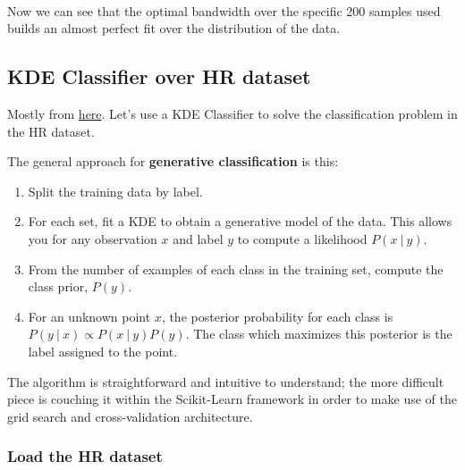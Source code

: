 \documentclass[11pt]{article}
\providecommand{\tightlist}{%
      \setlength{\itemsep}{0pt}\setlength{\parskip}{0pt}}
\begin{document}
    \begin{center}
    \end{center}
    { \hspace*{\fill} \\}
    
    Now we can see that the optimal bandwidth over the specific 200 samples
used builds an almost perfect fit over the distribution of the data.

    \hypertarget{kde-classifier-over-hr-dataset}{%
\subsection{KDE Classifier over HR
dataset}\label{kde-classifier-over-hr-dataset}}

Mostly from
\href{https://github.com/jakevdp/PythonDataScienceHandbook/blob/master/notebooks/05.13-Kernel-Density-Estimation.ipynb}{here}.
Let's use a KDE Classifier to solve the classification problem in the HR
dataset.

The general approach for \textbf{generative classification} is this:

\begin{enumerate}
\def\labelenumi{\arabic{enumi}.}
\tightlist
\item
  Split the training data by label.
\item
  For each set, fit a KDE to obtain a generative model of the data. This
  allows you for any observation \(x\) and label \(y\) to compute a
  likelihood \(P(x~|~y)\).
\item
  From the number of examples of each class in the training set, compute
  the class prior, \(P(y)\).
\item
  For an unknown point \(x\), the posterior probability for each class
  is \(P(y~|~x) \propto P(x~|~y)P(y)\). The class which maximizes this
  posterior is the label assigned to the point.
\end{enumerate}

The algorithm is straightforward and intuitive to understand; the more
difficult piece is couching it within the Scikit-Learn framework in
order to make use of the grid search and cross-validation architecture.

    \hypertarget{load-the-hr-dataset}{%
\subsubsection{Load the HR dataset}\label{load-the-hr-dataset}}
\end{document}
